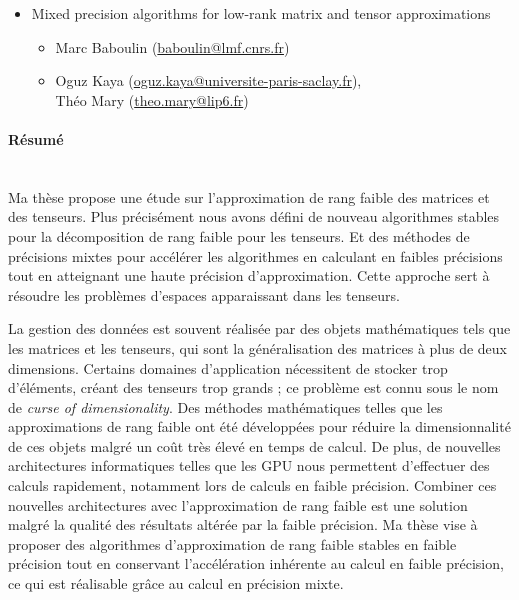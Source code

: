 \begin{itemize}
    \item[\ding{118}~ Titre :] Mixed precision algorithms for low-rank matrix and tensor approximations
          \begin{itemize}
              \item[\ding{226}~ Directeur de thèse :] Marc Baboulin
                    (\href{mailto:baboulin@lmf.cnrs.fr}{baboulin@lmf.cnrs.fr})
              \item[\ding{226}~ Co-directeur de thèse :] Oguz Kaya
                    (\href{mailto:oguz.kaya@universite-paris-saclay.fr}{oguz.kaya@universite-paris-saclay.fr}),\\
                    Théo Mary (\href{mailto:theo.mary@lip6.fr}{theo.mary@lip6.fr})
          \end{itemize}
\end{itemize}

\paragraph*{Résumé}\mbox{}\\

Ma thèse propose une étude sur l'approximation de rang faible des matrices et
des tenseurs. Plus précisément nous avons défini de nouveau algorithmes stables
pour la décomposition de rang faible pour les tenseurs. Et des méthodes de
précisions mixtes pour accélérer les algorithmes en calculant en faibles
précisions tout en atteignant une haute précision d'approximation. Cette
approche sert à résoudre les problèmes d'espaces apparaissant dans les
tenseurs.

La gestion des données est souvent réalisée par des objets mathématiques tels
que les matrices et les tenseurs, qui sont la généralisation des matrices à
plus de deux dimensions. Certains domaines d'application nécessitent de stocker
trop d'éléments, créant des tenseurs trop grands ; ce problème est connu sous
le nom de \emph{curse of dimensionality}. Des méthodes mathématiques telles que
les approximations de rang faible ont été développées pour réduire la
dimensionnalité de ces objets malgré un coût très élevé en temps de calcul. De
plus, de nouvelles architectures informatiques telles que les GPU nous
permettent d'effectuer des calculs rapidement, notamment lors de calculs en
faible précision. Combiner ces nouvelles architectures avec l'approximation de
rang faible est une solution malgré la qualité des résultats altérée par la
faible précision. Ma thèse vise à proposer des algorithmes d'approximation de
rang faible stables en faible précision tout en conservant l'accélération
inhérente au calcul en faible précision, ce qui est réalisable grâce au calcul
en précision mixte.

